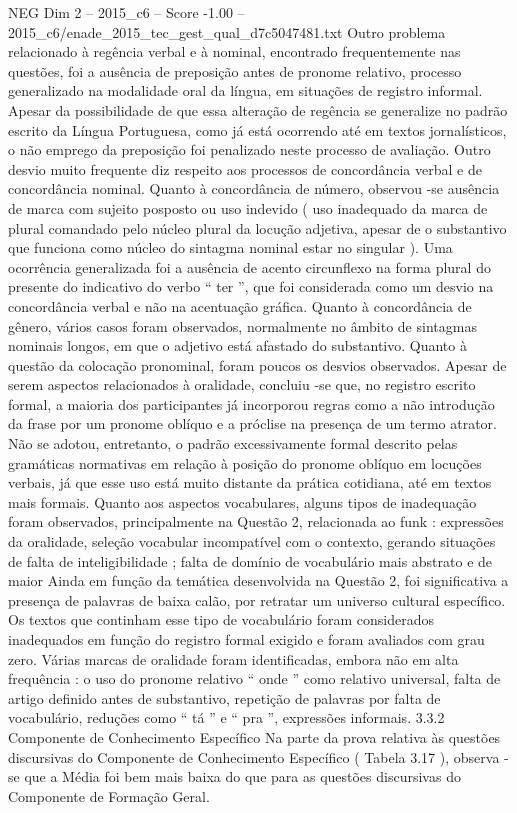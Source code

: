 \begin{textsample}{NEG Dim 2 – 2015\_c6 – Score -1.00 – 2015\_c6/enade\_2015\_tec\_gest\_qual\_d7c5047481.txt}
Outro problema relacionado à regência verbal e à nominal, encontrado frequentemente nas questões, foi a ausência de preposição antes de pronome relativo, processo generalizado na modalidade oral da língua, em situações de registro informal.
Apesar da possibilidade de que essa alteração de regência se generalize no padrão escrito da Língua Portuguesa, como já está ocorrendo até em textos jornalísticos, o não emprego da preposição foi penalizado neste processo de avaliação.
Outro desvio muito frequente diz respeito aos processos de concordância verbal e de concordância nominal.
Quanto à concordância de número, observou -se ausência de marca com sujeito posposto ou uso indevido ( uso inadequado da marca de plural comandado pelo núcleo plural da locução adjetiva, apesar de o substantivo que funciona como núcleo do sintagma nominal estar no singular ).
Uma ocorrência generalizada foi a ausência de acento circunflexo na forma plural do presente do indicativo do verbo “ ter ”, que foi considerada como um desvio na concordância verbal e não na acentuação gráfica.
Quanto à concordância de gênero, vários casos foram observados, normalmente no âmbito de sintagmas nominais longos, em que o adjetivo está afastado do substantivo.
Quanto à questão da colocação pronominal, foram poucos os desvios observados.
Apesar de serem aspectos relacionados à oralidade, concluiu -se que, no registro escrito formal, a maioria dos participantes já incorporou regras como a não introdução da frase por um pronome oblíquo e a próclise na presença de um termo atrator.
Não se adotou, entretanto, o padrão excessivamente formal descrito pelas gramáticas normativas em relação à posição do pronome oblíquo em locuções verbais, já que esse uso está muito distante da prática cotidiana, até em textos mais formais.
Quanto aos aspectos vocabulares, alguns tipos de inadequação foram observados, principalmente na Questão 2, relacionada ao funk : expressões da oralidade, seleção vocabular incompatível com o contexto, gerando situações de falta de inteligibilidade ; falta de domínio de vocabulário mais abstrato e de maior Ainda em função da temática desenvolvida na Questão 2, foi significativa a presença de palavras de baixa calão, por retratar um universo cultural específico.
Os textos que continham esse tipo de vocabulário foram considerados inadequados em função do registro formal exigido e foram avaliados com grau zero.
Várias marcas de oralidade foram identificadas, embora não em alta frequência : o uso do pronome relativo “ onde ” como relativo universal, falta de artigo definido antes de substantivo, repetição de palavras por falta de vocabulário, reduções como “ tá ” e “ pra ”, expressões informais. 3.3.2 Componente de Conhecimento Específico Na parte da prova relativa às questões discursivas do Componente de Conhecimento Específico ( Tabela 3.17 ), observa -se que a Média foi bem mais baixa do que para as questões discursivas do Componente de Formação Geral.

\end{textsample}
